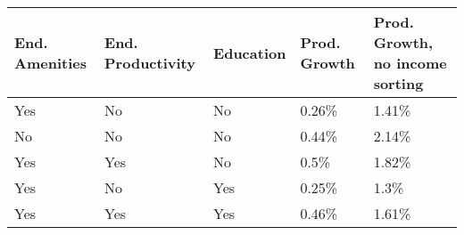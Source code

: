 
\begin{tabular}{lllll}
\hline
\hline
End. Amenities & End. Productivity & Education & Prod. Growth & Prod. Growth, no income sorting \\ 
\hline
Yes & No & No & 0.26\% & 1.41\% \\ 
No & No & No & 0.44\% & 2.14\% \\ 
Yes & Yes & No & 0.5\% & 1.82\% \\ 
Yes & No & Yes & 0.25\% & 1.3\% \\ 
Yes & Yes & Yes & 0.46\% & 1.61\%\\ 
\hline
\hline
\end{tabular}


